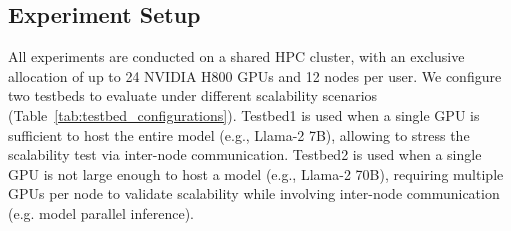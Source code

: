 \subsection{Experiment Setup}
\label{sec:evaluation:setup}

All experiments are conducted on a shared HPC cluster, with an exclusive allocation of up to 24 NVIDIA H800 GPUs and 12 nodes per user. 
%
We configure two testbeds to evaluate \SysName under different scalability scenarios (Table~\ref{tab:testbed_configurations}). Testbed1 is used when a single GPU is sufficient to host the entire model (e.g., Llama-2 7B), 
allowing to stress the scalability test via inter-node communication. 
Testbed2 is used when a single GPU is not large enough to host a model (e.g., Llama-2 70B), 
requiring multiple GPUs per node to validate scalability while involving inter-node communication (e.g. model parallel inference).  






